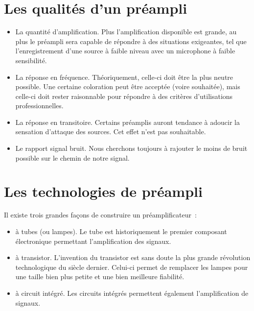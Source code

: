 \documentclass[
]{book}
\providecommand{\tightlist}{%
  \setlength{\itemsep}{0pt}\setlength{\parskip}{0pt}}
\begin{document}
\hypertarget{les-qualituxe9s-dun-pruxe9ampli}{%
\section{Les qualités d'un préampli}\label{les-qualituxe9s-dun-pruxe9ampli}}

\begin{itemize}
\tightlist
\item
  La quantité d'amplification. Plus l'amplification disponible est grande, au plus le préampli sera capable de répondre à des situations exigeantes, tel que l'enregistrement d'une source à faible niveau avec un microphone à faible sensibilité.
\item
  La réponse en fréquence. Théoriquement, celle-ci doit être la plus neutre possible. Une certaine coloration peut être acceptée (voire souhaitée), mais celle-ci doit rester raisonnable pour répondre à des critères d'utilisations professionnelles.
\item
  La réponse en transitoire. Certains préamplis auront tendance à adoucir la sensation d'attaque des sources. Cet effet n'est pas souhaitable.
\item
  Le rapport signal bruit. Nous cherchons toujours à rajouter le moins de bruit possible sur le chemin de notre signal.
\end{itemize}

\hypertarget{les-technologies-de-pruxe9ampli}{%
\section{Les technologies de préampli}\label{les-technologies-de-pruxe9ampli}}

Il existe trois grandes façons de construire un préamplificateur~:

\begin{itemize}
\tightlist
\item
  à tubes (ou lampes). Le tube est historiquement le premier composant électronique permettant l'amplification des signaux.
\item
  à transistor. L'invention du transistor est sans doute la plus grande révolution technologique du siècle dernier. Celui-ci permet de remplacer les lampes pour une taille bien plus petite et une bien meilleure fiabilité.
\item
  à circuit intégré. Les circuits intégrés permettent également l'amplification de signaux.
\end{itemize}
\end{document}
